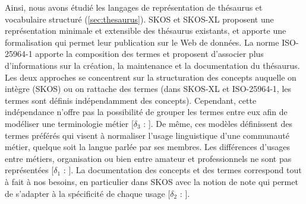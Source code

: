 Ainsi, nous avons étudié les langages de représentation de thésaurus et vocabulaire structuré (\ref{sec:thesaurus}).
SKOS et SKOS-XL proposent une représentation minimale et extensible des thésaurus existants, et apporte une formalisation qui permet leur publication sur le Web de données.
La norme ISO-25964-1 apporte la composition des termes et proposent d'associer plus d'informations sur la création, la maintenance et la documentation du thésaurus.
Les deux approches se concentrent sur la structuration des concepts auquelle on intègre (SKOS) ou on rattache des termes (dans SKOS-XL et ISO-25964-1, les termes sont définis indépendamment des concepts). 
Cependant, cette indépendance n'offre pas la possibilité de grouper les termes entre eux afin de modéliser une terminologie métier [$\delta_3$ : ]. 
De même, ces modèles définissent des termes préférés qui visent à normaliser l'usage linguistique d'une communauté métier, quelque soit la langue parlée par ses membres.
Les différences d'usages entre métiers, organisation ou bien entre amateur et professionnels ne sont pas représentées [$\delta_1$ : ]. 
La documentation des concepts et des termes correspond tout à fait à nos besoins, en particulier dans SKOS avec la notion de note qui permet de s'adapter à la spécificité de chaque usage [$\delta_2$ : ].\\



